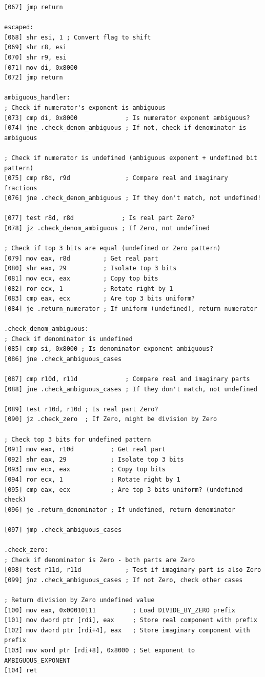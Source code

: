 \documentclass[12pt,letter]{article}
\begin{document}
\begin{lstlisting}[style=rust, caption={Full complex division assembly instructions including ambiguous handling}, label={fig:circle_divide}]
[067] jmp return

escaped:
[068] shr esi, 1 ; Convert flag to shift
[069] shr r8, esi                      
[070] shr r9, esi
[071] mov di, 0x8000
[072] jmp return

ambiguous_handler:
; Check if numerator's exponent is ambiguous
[073] cmp di, 0x8000             ; Is numerator exponent ambiguous?
[074] jne .check_denom_ambiguous ; If not, check if denominator is ambiguous

; Check if numerator is undefined (ambiguous exponent + undefined bit pattern)
[075] cmp r8d, r9d               ; Compare real and imaginary fractions
[076] jne .check_denom_ambiguous ; If they don't match, not undefined!

[077] test r8d, r8d             ; Is real part Zero?
[078] jz .check_denom_ambiguous ; If Zero, not undefined

; Check if top 3 bits are equal (undefined or Zero pattern)
[079] mov eax, r8d         ; Get real part
[080] shr eax, 29          ; Isolate top 3 bits
[081] mov ecx, eax         ; Copy top bits
[082] ror ecx, 1           ; Rotate right by 1
[083] cmp eax, ecx         ; Are top 3 bits uniform?
[084] je .return_numerator ; If uniform (undefined), return numerator

.check_denom_ambiguous:
; Check if denominator is undefined
[085] cmp si, 0x8000 ; Is denominator exponent ambiguous?
[086] jne .check_ambiguous_cases

[087] cmp r10d, r11d             ; Compare real and imaginary parts
[088] jne .check_ambiguous_cases ; If they don't match, not undefined

[089] test r10d, r10d ; Is real part Zero?
[090] jz .check_zero  ; If Zero, might be division by Zero

; Check top 3 bits for undefined pattern
[091] mov eax, r10d          ; Get real part
[092] shr eax, 29            ; Isolate top 3 bits
[093] mov ecx, eax           ; Copy top bits
[094] ror ecx, 1             ; Rotate right by 1
[095] cmp eax, ecx           ; Are top 3 bits uniform? (undefined check)
[096] je .return_denominator ; If undefined, return denominator

[097] jmp .check_ambiguous_cases

.check_zero:
; Check if denominator is Zero - both parts are Zero
[098] test r11d, r11d            ; Test if imaginary part is also Zero
[099] jnz .check_ambiguous_cases ; If not Zero, check other cases

; Return division by Zero undefined value
[100] mov eax, 0x00010111          ; Load DIVIDE_BY_ZERO prefix
[101] mov dword ptr [rdi], eax     ; Store real component with prefix
[102] mov dword ptr [rdi+4], eax   ; Store imaginary component with prefix
[103] mov word ptr [rdi+8], 0x8000 ; Set exponent to AMBIGUOUS_EXPONENT
[104] ret


\end{lstlisting}
\end{document}
